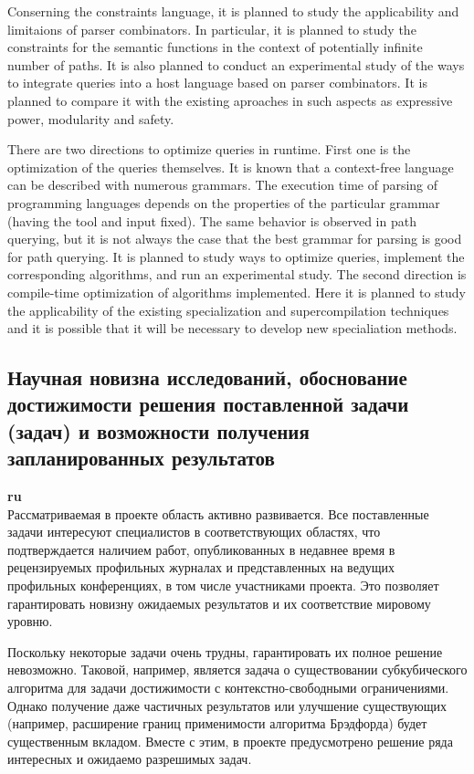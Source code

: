 \documentclass[12pt]{article}  %
\theoremstyle{remark}
\begin{document}
Conserning the constraints language, it is planned to study the applicability and limitaions of parser combinators.
In particular, it is planned to study the constraints for the semantic functions in the context of potentially infinite number of paths.
It is also planned to conduct an experimental study of the ways to integrate queries into a host language  based on parser combinators.
It is planned to compare it with the existing aproaches in such aspects as expressive power, modularity and safety.

There are two directions to optimize queries in runtime.
First one is the optimization of the queries themselves.
It is known that a context-free language can be described with numerous grammars.
The execution time of parsing of programming languages depends on the properties of the particular grammar (having the tool and input fixed).
The same behavior is observed in path querying, but it is not always the case that the best grammar for parsing is good for path querying.
It is planned to study ways to optimize queries, implement the corresponding algorithms, and run an experimental study.
The second direction is compile-time optimization of algorithms implemented.
Here it is planned to study the applicability of the existing specialization and supercompilation techniques and it is possible that it will be necessary to develop new specialiation methods.


\subsection{Научная новизна исследований, обоснование достижимости решения поставленной задачи (задач) и возможности получения запланированных результатов}

\textbf{ru}\\
%
Рассматриваемая в проекте область активно развивается. Все поставленные задачи интересуют специалистов в соответствующих областях, что подтверждается наличием работ, опубликованных в недавнее время в рецензируемых профильных журналах и представленных на ведущих профильных конференциях, в том числе участниками проекта. Это позволяет гарантировать новизну ожидаемых результатов и их соответствие мировому уровню.

Поскольку некоторые задачи очень трудны, гарантировать их полное решение невозможно. Таковой, например, является задача о существовании субкубического алгоритма для задачи достижимости с контекстно-свободными ограничениями. Однако получение даже частичных результатов или улучшение существующих (например, расширение границ применимости алгоритма Брэдфорда) будет существенным вкладом. Вместе с этим, в проекте предусмотрено решение ряда интересных и ожидаемо разрешимых задач.
\end{document}
